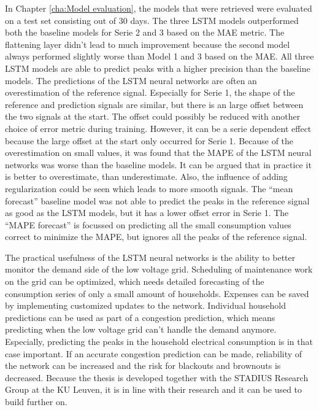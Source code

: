 In Chapter \ref{cha:Model evaluation}, the models that were retrieved were evaluated on a test set consisting out of 30 days. The three LSTM models outperformed both the baseline models for Serie 2 and 3 based on the MAE metric. The flattening layer didn't lead to much improvement because the second model always performed slightly worse than Model 1 and 3 based on the MAE. All three LSTM models are able to predict peaks with a higher precision than the baseline models. The predictions of the LSTM neural networks are often an overestimation of the reference signal. Especially for Serie 1, the shape of the reference and prediction signals are similar, but there is an large offset between the two signals at the start. The offset could possibly be reduced with another choice of error metric during training. However, it can be a serie dependent effect because the large offset at the start only occurred for Serie 1. Because of the overestimation on small values, it was found that the MAPE of the LSTM neural networks was worse than the baseline models. It can be argued that in practice it is better to overestimate, than underestimate. Also, the influence of adding regularization could be seen which leads to more smooth signals. The ``mean forecast'' baseline model was not able to predict the peaks in the reference signal as good as the LSTM models, but it has a lower offset error in Serie 1. The ``MAPE forecast'' is focussed on predicting all the small consumption values correct to minimize the MAPE, but ignores all the peaks of the reference signal.

The practical usefulness of the LSTM neural networks is the ability to better monitor the demand side of the low voltage grid. Scheduling of maintenance work on the grid can be optimized, which needs detailed forecasting of the consumption series of only a small amount of households. Expenses can be saved by implementing customized updates to the network. Individual household predictions can be used as part of a congestion prediction, which means predicting when the low voltage grid can't handle the demand anymore. Especially, predicting the peaks in the household electrical consumption is in that case important. If an accurate congestion prediction can be made, reliability of the network can be increased and the risk for blackouts and brownouts is decreased. Because the thesis is developed together with the STADIUS Research Group at the KU Leuven, it is in line with their research and it can be used to build further on.\\


